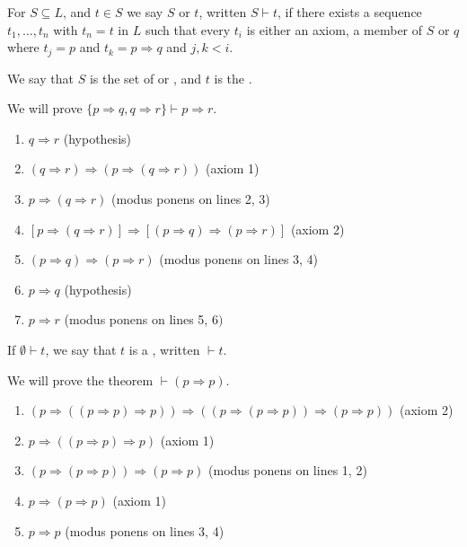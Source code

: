 \documentclass[a4paper]{scrartcl}
\begin{document}
\begin{definition}
  For $S \subseteq L$, and $t \in S$ we say $S$  or  $t$, written $S \vdash t$, if there exists a sequence $t_1, \dots, t_n$ with $t_n = t$ in $L$ such that every $t_i$ is either an axiom, a member of $S$ or $q$ where $t_j = p$ and $t_k = p \Rightarrow q$ and $j, k < i$.

  We say that $S$ is the set of  or , and $t$ is the .
\end{definition}

\begin{example}
  We will prove $\{p\Rightarrow q, q \Rightarrow r\} \vdash p \Rightarrow r$.

  \begin{enumerate}
    \item $q \Rightarrow r$ (hypothesis)
    \item $(q \Rightarrow r) \Rightarrow(p \Rightarrow(q \Rightarrow r))$ (axiom 1)
    \item $p \Rightarrow(q \Rightarrow r)$ (modus ponens on lines 2, 3)
    \item $[p \Rightarrow(q \Rightarrow r)] \Rightarrow[(p \Rightarrow q) \Rightarrow(p \Rightarrow r)]$ (axiom 2)
    \item $(p \Rightarrow q) \Rightarrow(p \Rightarrow r)$ (modus ponens on lines 3, 4)
    \item $p \Rightarrow q$ (hypothesis)
    \item $p \Rightarrow r$ (modus ponens on lines 5, 6$)$
  \end{enumerate}
\end{example}

\begin{definition}[Theorem]
  If $\emptyset \vdash t$, we say that $t$ is a , written $\vdash t$.
\end{definition}

\begin{example}
  We will prove the theorem $\vdash (p \Rightarrow p)$.

  \begin{enumerate}
    \item $(p \Rightarrow((p \Rightarrow p) \Rightarrow p)) \Rightarrow((p \Rightarrow(p \Rightarrow p)) \Rightarrow(p \Rightarrow p))$ (axiom 2)
    \item $p \Rightarrow((p \Rightarrow p) \Rightarrow p)$ (axiom 1)
    \item $(p \Rightarrow(p \Rightarrow p)) \Rightarrow(p \Rightarrow p)$ (modus ponens on lines 1, 2)
    \item $p \Rightarrow(p \Rightarrow p)$ (axiom 1)
    \item $p \Rightarrow p$ (modus ponens on lines 3, 4)
  \end{enumerate}
\end{example}
\end{document}
